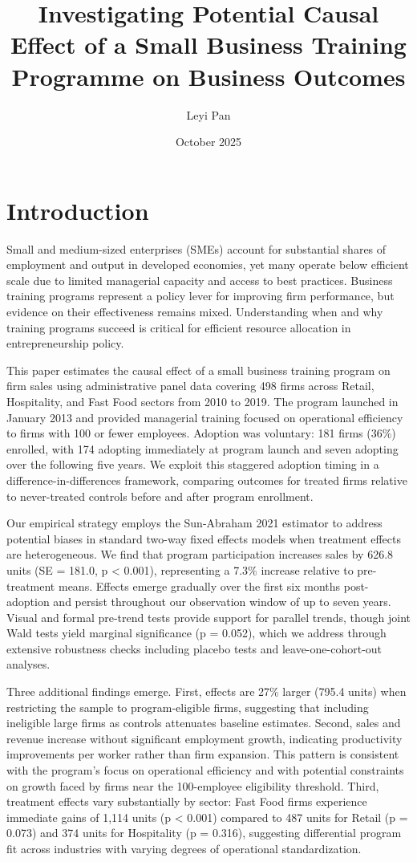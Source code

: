 \documentclass{article}
\title{Investigating Potential Causal Effect of a Small Business Training Programme on Business Outcomes}
\author{Leyi Pan}
\date{October 2025}
\begin{document}
\maketitle

\section{Introduction}

Small and medium-sized enterprises (SMEs) account for substantial shares of employment and output in developed economies, yet many operate below efficient scale due to limited managerial capacity and access to best practices. Business training programs represent a policy lever for improving firm performance, but evidence on their effectiveness remains mixed. Understanding when and why training programs succeed is critical for efficient resource allocation in entrepreneurship policy.

This paper estimates the causal effect of a small business training program on firm sales using administrative panel data covering 498 firms across Retail, Hospitality, and Fast Food sectors from 2010 to 2019. The program launched in January 2013 and provided managerial training focused on operational efficiency to firms with 100 or fewer employees. Adoption was voluntary: 181 firms (36\%) enrolled, with 174 adopting immediately at program launch and seven adopting over the following five years. We exploit this staggered adoption timing in a difference-in-differences framework, comparing outcomes for treated firms relative to never-treated controls before and after program enrollment.

Our empirical strategy employs the Sun-Abraham 2021 estimator to address potential biases in standard two-way fixed effects models when treatment effects are heterogeneous. We find that program participation increases sales by 626.8 units (SE = 181.0, p < 0.001), representing a 7.3\% increase relative to pre-treatment means. Effects emerge gradually over the first six months post-adoption and persist throughout our observation window of up to seven years. Visual and formal pre-trend tests provide support for parallel trends, though joint Wald tests yield marginal significance (p = 0.052), which we address through extensive robustness checks including placebo tests and leave-one-cohort-out analyses.

Three additional findings emerge. First, effects are 27\% larger (795.4 units) when restricting the sample to program-eligible firms, suggesting that including ineligible large firms as controls attenuates baseline estimates. Second, sales and revenue increase without significant employment growth, indicating productivity improvements per worker rather than firm expansion. This pattern is consistent with the program's focus on operational efficiency and with potential constraints on growth faced by firms near the 100-employee eligibility threshold. Third, treatment effects vary substantially by sector: Fast Food firms experience immediate gains of 1,114 units (p < 0.001) compared to 487 units for Retail (p = 0.073) and 374 units for Hospitality (p = 0.316), suggesting differential program fit across industries with varying degrees of operational standardization.
\end{document}
